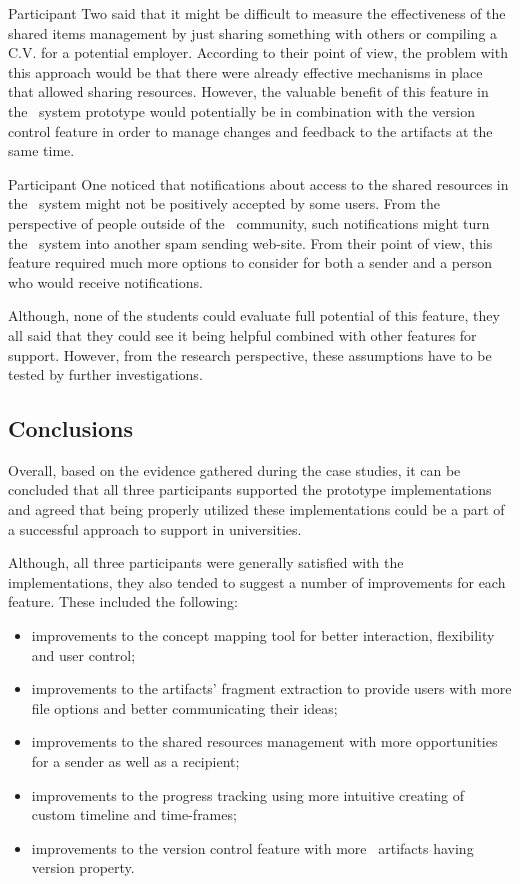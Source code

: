 Participant Two said that it might be difficult to measure the effectiveness
of the shared items management by just sharing something with others or
compiling a C.V. for a potential employer. According to their point of view, the
problem with this approach would be that there were already effective mechanisms
in place that allowed sharing resources. However, the valuable benefit of this
feature in the \ep~system prototype would potentially be in combination with the
version control feature in order to manage changes and feedback to the artifacts
at the same time.

Participant One noticed that notifications about access to the shared resources
in the \ep~system might not be positively accepted by some users. From the
perspective of people outside of the \ep~community, such notifications might
turn the \ep~system into another spam sending web-site. From their point of
view, this feature required much more options to consider for both a sender and
a person who would receive notifications.

Although, none of the students could evaluate full potential of this feature,
they all said that they could see it being helpful combined with other features
for \LLLs support. However, from the research perspective, these assumptions
have to be tested by further investigations.

\subsection{Conclusions}

Overall, based on the evidence gathered during the case studies, it can be
concluded that all three participants supported the prototype implementations
and agreed that being properly utilized these implementations could be a part of
a successful approach to \LLLs support in universities.

Although, all three participants were generally satisfied with the
implementations, they also tended to suggest a number of improvements for each
feature. These included the following:

\begin{itemize}
  \item improvements to the concept mapping tool for better interaction,
  flexibility and user control;
  \item improvements to the artifacts' fragment extraction to provide users with
  more file options and better communicating their ideas;
  \item improvements to the shared resources management with more opportunities
  for a sender as well as a recipient; 
  \item improvements to the progress tracking using more intuitive creating of
  custom timeline and time-frames;
  \item improvements to the version control feature with more \ep~artifacts
  having version property.
\end{itemize}

